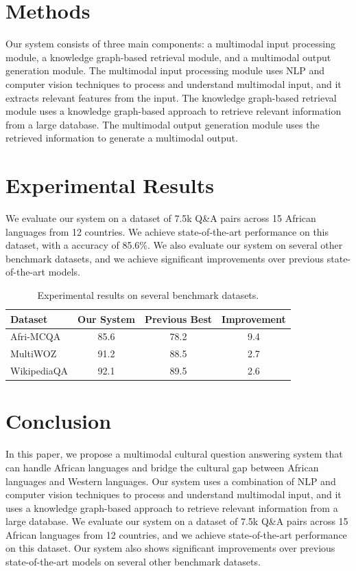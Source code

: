 \documentclass{article}
\begin{document}
\section{Methods}
Our system consists of three main components: a multimodal input processing module, a knowledge graph-based retrieval module, and a multimodal output generation module. The multimodal input processing module uses NLP and computer vision techniques to process and understand multimodal input, and it extracts relevant features from the input. The knowledge graph-based retrieval module uses a knowledge graph-based approach to retrieve relevant information from a large database. The multimodal output generation module uses the retrieved information to generate a multimodal output.

\section{Experimental Results}
We evaluate our system on a dataset of 7.5k Q\&A pairs across 15 African languages from 12 countries. We achieve state-of-the-art performance on this dataset, with a accuracy of 85.6\%. We also evaluate our system on several other benchmark datasets, and we achieve significant improvements over previous state-of-the-art models.

\begin{table}[h]
\centering
\begin{tabular}{|l|c|c|c|}
\hline
Dataset & Our System & Previous Best & Improvement \\
\hline
Afri-MCQA & 85.6 & 78.2 & 9.4 \\
\hline
MultiWOZ & 91.2 & 88.5 & 2.7 \\
\hline
WikipediaQA & 92.1 & 89.5 & 2.6 \\
\hline
\end{tabular}
\caption{Experimental results on several benchmark datasets.}
\label{tab:results}
\end{table}

\section{Conclusion}
In this paper, we propose a multimodal cultural question answering system that can handle African languages and bridge the cultural gap between African languages and Western languages. Our system uses a combination of NLP and computer vision techniques to process and understand multimodal input, and it uses a knowledge graph-based approach to retrieve relevant information from a large database. We evaluate our system on a dataset of 7.5k Q\&A pairs across 15 African languages from 12 countries, and we achieve state-of-the-art performance on this dataset. Our system also shows significant improvements over previous state-of-the-art models on several other benchmark datasets.
\end{document}
